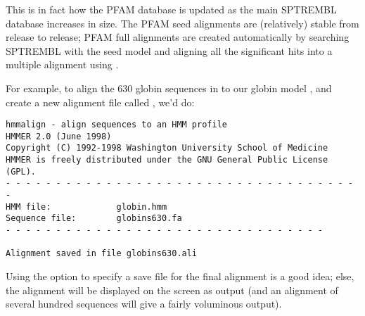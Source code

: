This is in fact how the PFAM database is updated as the main SPTREMBL
database increases in size. The PFAM seed alignments are (relatively)
stable from release to release; PFAM full alignments are created
automatically by searching SPTREMBL with the seed model and aligning
all the significant hits into a multiple alignment using .

For example, to align the 630 globin sequences in 
to our globin model , and create a new alignment file
called , we'd do:

\vspace{1.5em}
\vspace{-1.5em}
{\small\begin{verbatim}
hmmalign - align sequences to an HMM profile
HMMER 2.0 (June 1998)
Copyright (C) 1992-1998 Washington University School of Medicine
HMMER is freely distributed under the GNU General Public License (GPL).
- - - - - - - - - - - - - - - - - - - - - - - - - - - - - - - - - - - -
HMM file:             globin.hmm
Sequence file:        globins630.fa
- - - - - - - - - - - - - - - - - - - - - - - - - - - - - - - -

Alignment saved in file globins630.ali
\end{verbatim}}

Using the  option to specify a save file for the final
alignment is a good idea; else, the alignment will be displayed on the
screen as output (and an alignment of several hundred sequences will
give a fairly voluminous output).


